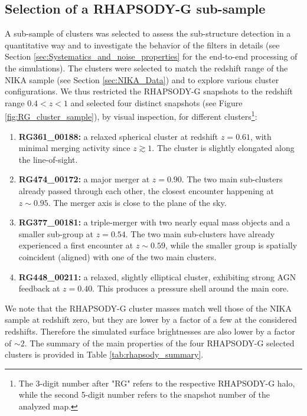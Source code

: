 \documentclass[twocolumn,traditabstract]{aa}
\begin{document}
\subsection{Selection of a RHAPSODY-G sub-sample}\label{sec:Selection_of_a_RHAPSODY-G_sub-sample}
A sub-sample of clusters was selected to assess the sub-structure detection in a quantitative way and to investigate the behavior of the filters in details (see Section \ref{sec:Systematics_and_noise_properties} for the end-to-end processing of the simulations). The clusters were selected to match the redshift range of the NIKA sample (see Section \ref{sec:NIKA_Data}) and to explore various cluster configurations. We thus restricted the RHAPSODY-G snapshots to the redshift range $0.4<z<1$ and selected four distinct snapshots (see Figure \ref{fig:RG_cluster_sample}), by visual inspection, for different clusters\footnote{The 3-digit number after "RG" refers to the respective RHAPSODY-G halo, while the second 5-digit number refers to the snapshot number of the analyzed map.}:
\begin{enumerate}
\item {\bf RG361\_00188:} a relaxed spherical cluster at redshift $z = 0.61$, with minimal merging activity since $z \gtrsim 1$. The cluster is slightly elongated along the line-of-sight.
\item {\bf RG474\_00172:} a major merger at $z = 0.90$. The two main sub-clusters already passed through each other, the closest encounter happening at $z \sim 0.95$. The merger axis is close to the plane of the sky. 
\item {\bf RG377\_00181:} a triple-merger with two nearly equal mass objects and a smaller sub-group at $z = 0.54$. The two main sub-clusters have already experienced a first encounter at $z \sim 0.59$, while the smaller group is spatially coincident (aligned) with one of the two main clusters.
\item {\bf RG448\_00211:} a relaxed, slightly elliptical cluster, exhibiting strong AGN feedback at $z = 0.40$. This produces a pressure shell around the main core.
\end{enumerate}
We note that the RHAPSODY-G cluster masses match well those of the NIKA sample at redshift zero, but they are lower by a factor of a few at the considered redshifts. Therefore the simulated surface brightnesses are also lower by a factor of $\sim 2$. The summary of the main properties of the four RHAPSODY-G selected clusters is provided in Table \ref{tab:rhapsody_summary}.
\end{document}
